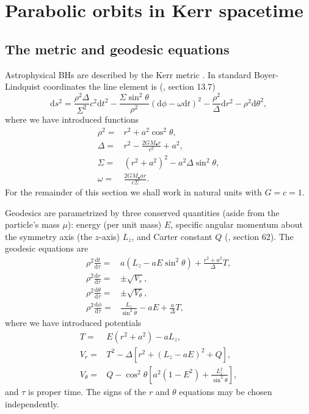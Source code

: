 \documentclass[useAMS,usedcolumn,usegraphicx,usenatbib]{mn2e}
\newcommand{\dd}{\ensuremath{\mathrm{d}}}
\newcommand{\diff}[2]{\ensuremath{\frac{\dd {#1}}{\dd {#2}}}}
\begin{document}
\section{Parabolic orbits in Kerr spacetime}\label{sec:Geodesic}

\subsection{The metric and geodesic equations}

Astrophysical BHs are described by the Kerr metric \citep{Kerr1963}. In standard Boyer-Lindquist coordinates the line element is (\citealt*{Boyer1967, Hobson2006}, section 13.7)
\begin{equation}
\dd s^2 = \frac{\rho^2 \Delta}{\Sigma^2}c^2\dd t^2 - \frac{\Sigma \sin^2 \theta}{\rho^2}\left(\dd \phi - \omega \dd t\right)^2 - \frac{\rho^2}{\Delta}\dd r^2 - \rho^2\dd \theta^2,
\end{equation}
where we have introduced functions
\begin{align}
\rho^2 = {} & r^2 + a^2\cos^2\theta,\\
\Delta = {} & r^2 - \frac{2GM_\bullet r}{c^2} + a^2,\\
\Sigma = {} & \left(r^2 +a^2\right)^2 - a^2\Delta\sin^2\theta,\\
\omega = {} & \frac{2GM_\bullet ar}{c\Sigma}.
\end{align}
For the remainder of this section we shall work in natural units with $G = c = 1$.

Geodesics are parametrized by three conserved quantities (aside from the particle's mass $\mu$): energy (per unit mass) $E$, specific angular momentum about the symmetry axis (the $z$-axis) $L_z$, and Carter constant $Q$ (\citealt{Carter1968, Chandrasekhar1998}, section 62). The geodesic equations are
\begin{align}
\rho^2 \diff{t}{\tau} = {} & a\left(L_z - aE\sin^2 \theta\right) + \frac{r^2 + a^2}{\Delta}T,\\
\rho^2 \diff{r}{\tau} = {} & \pm \sqrt{V_r},\\
\rho^2 \diff{\theta}{\tau} = {} & \pm \sqrt{V_\theta},\\
\rho^2 \diff{\phi}{\tau} = {} & \frac{L_z}{\sin^2 \theta} - aE + \frac{a}{\Delta}T,
\end{align}
where we have introduced potentials
\begin{align}
T = {} & E\left(r^2 +a^2\right) - aL_z,\\
V_r = {} & T^2 - \Delta\left[r^2 + \left(L_z -aE\right)^2 + Q\right],\\
V_\theta = {} & Q - \cos^2 \theta\left[a^2\left(1 - E^2\right) + \frac{L_z^2}{\sin^2\theta}\right],
\end{align}
and $\tau$ is proper time. The signs of the $r$ and $\theta$ equations may be chosen independently.
\end{document}
